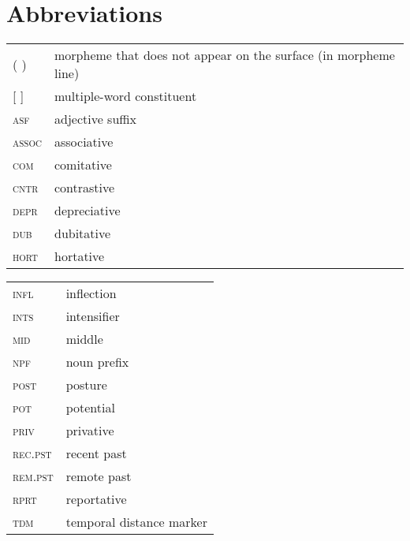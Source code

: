\documentclass[output=paper,draft,draftmode,colorlinks,citecolor=brown]{langscibook}
\begin{document}
\section*{Abbreviations}
\begin{tabularx}{.45\textwidth}{lQ}
    ( ) & morpheme that does not appear on the surface (in morpheme line) \\
    {[} {]} & multiple-word constituent \\
    \textsc{asf} & adjective suffix \\
    \textsc{assoc} & associative \\
    \textsc{com} & comitative \\
    \textsc{cntr} & contrastive \\
    \textsc{depr} & depreciative \\
    \textsc{dub} & dubitative \\
    \textsc{hort} & hortative \\
    \end{tabularx}
\begin{tabularx}{.45\textwidth}{lQ}
    \textsc{infl} & inflection \\
    \textsc{ints} & intensifier \\
    \textsc{mid} & middle \\
    \textsc{npf} & noun prefix \\
    \textsc{post} & posture \\
    \textsc{pot} & potential \\
    \textsc{priv} & privative \\
    \textsc{rec.pst} & recent past \\
    \textsc{rem.pst} & remote past \\
    \textsc{rprt} & reportative \\
    \textsc{tdm} & temporal distance marker \\
\end{tabularx}
\end{document}

